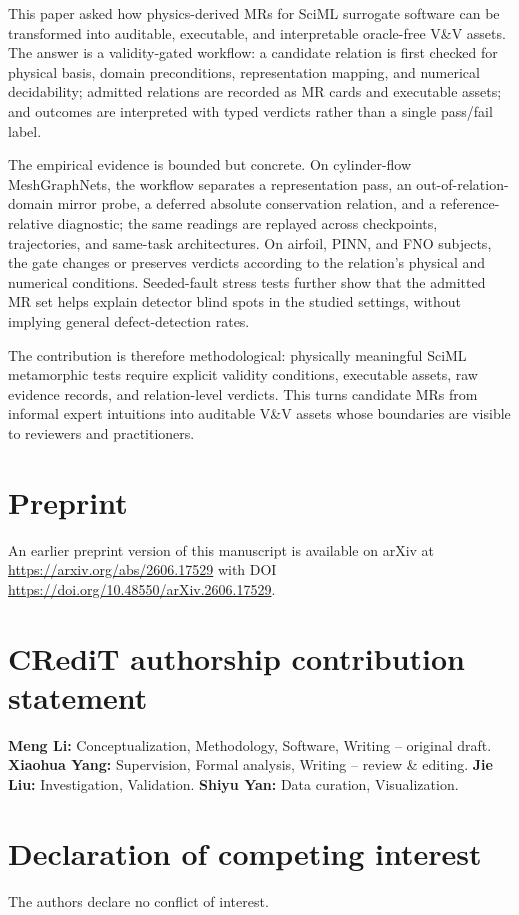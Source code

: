 \documentclass[preprint,12pt]{elsarticle}
\begin{document}
This paper asked how physics-derived MRs for SciML surrogate software can be transformed into auditable, executable, and interpretable oracle-free V\&V assets. The answer is a validity-gated workflow: a candidate relation is first checked for physical basis, domain preconditions, representation mapping, and numerical decidability; admitted relations are recorded as MR cards and executable assets; and outcomes are interpreted with typed verdicts rather than a single pass/fail label.

The empirical evidence is bounded but concrete. On cylinder-flow MeshGraphNets, the workflow separates a representation pass, an out-of-relation-domain mirror probe, a deferred absolute conservation relation, and a reference-relative diagnostic; the same readings are replayed across checkpoints, trajectories, and same-task architectures. On airfoil, PINN, and FNO subjects, the gate changes or preserves verdicts according to the relation's physical and numerical conditions. Seeded-fault stress tests further show that the admitted MR set helps explain detector blind spots in the studied settings, without implying general defect-detection rates.

The contribution is therefore methodological: physically meaningful SciML metamorphic tests require explicit validity conditions, executable assets, raw evidence records, and relation-level verdicts. This turns candidate MRs from informal expert intuitions into auditable V\&V assets whose boundaries are visible to reviewers and practitioners.

\section*{Preprint}
An earlier preprint version of this manuscript is available on arXiv at \url{https://arxiv.org/abs/2606.17529} with DOI \url{https://doi.org/10.48550/arXiv.2606.17529}.

\section*{CRediT authorship contribution statement}
\textbf{Meng Li:} Conceptualization, Methodology, Software, Writing -- original draft. \textbf{Xiaohua Yang:} Supervision, Formal analysis, Writing -- review \& editing. \textbf{Jie Liu:} Investigation, Validation. \textbf{Shiyu Yan:} Data curation, Visualization.

\section*{Declaration of competing interest}
The authors declare no conflict of interest.
\end{document}
